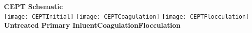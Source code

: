 \vspace{0.6cm}
\hspace{6.8 cm} \textbf{CEPT Schematic}\\
\vspace{0.6cm}
\hspace{1.5 cm}\texttt{[image: CEPTInitial]} \hspace{0.7 cm}\texttt{[image: CEPTCoagulation]}\hspace{0.7 cm}
\texttt{[image: CEPTFlocculation]}\\
\hspace{0.8 cm} \textbf{Untreated Primary Inluent}\hspace{1.6 cm}\textbf{Coagulation}\hspace{2.8 cm}\textbf{Flocculation}\\	
	

\newpage
